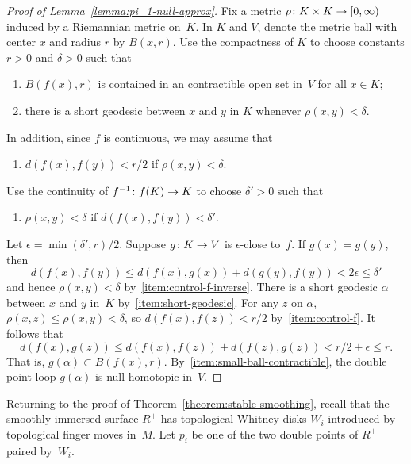 \documentclass[11pt]{amsart}
\def\to{\mathchoice{\longrightarrow}{\rightarrow}{\rightarrow}{\rightarrow}}
\theoremstyle{definition}
\theoremstyle{theorem-giventitle}
\theoremstyle{definition-giventitle}
\numberwithin{equation}{section}
\begin{document}
\begin{proof}[Proof of Lemma~\ref{lemma:pi_1-null-approx}]
  Fix a metric $\rho\colon K\times K \to [0,\infty)$ induced by a Riemannian metric on~$K$.
  In $K$ and $V$, denote the metric ball with center $x$ and radius $r$ by $B(x,r)$.
  Use the compactness of $K$ to choose constants $r>0$ and $\delta>0$ such that 
  \begin{enumerate}[label=(\roman*)]
    \item\label{item:small-ball-contractible} $B(f(x),r)$ is contained in an contractible open set in~$V$ for all $x\in K$;
    \item\label{item:short-geodesic} there is a short geodesic between $x$ and $y$ in $K$ whenever $\rho(x,y)<\delta$.
  \end{enumerate}
  In addition, since $f$ is continuous, we may assume that
  \begin{enumerate}[resume*]
    \item\label{item:control-f} $d(f(x),f(y)) < r/2$ if $\rho(x,y)<\delta$.
  \end{enumerate}
  Use the continuity of $f^{-1}\colon f(K) \to K$ to choose $\delta' >0$ such that 
  \begin{enumerate}[resume*]
    \item\label{item:control-f-inverse} $\rho(x,y)<\delta$ if $d(f(x),f(y))<\delta'$.
  \end{enumerate}

  Let $\epsilon=\min(\delta', r)/2$.
  Suppose $g \colon K\to V$ is $\epsilon$-close to~$f$.
  If $g(x)=g(y)$, then
  \[
    d(f(x), f(y))\leq d(f(x),g(x))+d(g(y), f(y))<2\epsilon \le \delta'
  \]
  and hence $\rho(x,y)<\delta$ by~\ref{item:control-f-inverse}.
  There is a short geodesic $\alpha$ between $x$ and $y$ in~$K$ by~\ref{item:short-geodesic}.
  For any $z$ on $\alpha$, $\rho(x,z)\leq \rho(x,y)<\delta$, so $d(f(x),f(z)) < r/2$ by~\ref{item:control-f}.
  It follows that
  \[
    d(f(x),g(z)) \leq d(f(x),f(z))+d(f(z),g(z) )< r/2 +\epsilon \leq r.
  \]
  That is, $g(\alpha)\subset B(f(x), r)$.
  By~\ref{item:small-ball-contractible}, the double point loop $g(\alpha)$ is null-homotopic in~$V$.
\end{proof}


Returning to the proof of Theorem~\ref{theorem:stable-smoothing}, recall that 
the smoothly immersed surface $R^+$ has topological Whitney disks $W_i$ introduced by topological finger moves in~$M$.
Let $p_i$ be one of the two double points of $R^+$ paired by~$W_i$.
\end{document}
